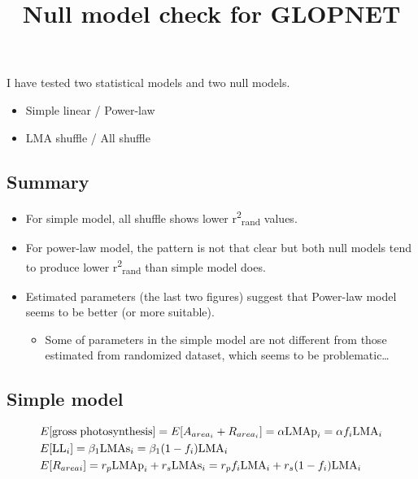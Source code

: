 \documentclass[12pt,]{article}
\title{Null model check for GLOPNET}
\author{}
\date{}
\providecommand{\tightlist}{%
  \setlength{\itemsep}{0pt}\setlength{\parskip}{0pt}}
\theoremstyle{definition}
\theoremstyle{definition}
\theoremstyle{remark}
\begin{document}
\maketitle

I have tested two statistical models and two null models.

\begin{itemize}
\tightlist
\item
  Simple linear / Power-law
\item
  LMA shuffle / All shuffle
\end{itemize}

\subsection{Summary}\label{summary}

\begin{itemize}
\tightlist
\item
  For simple model, all shuffle shows lower
  r\textsuperscript{2}\textsubscript{rand} values.
\item
  For power-law model, the pattern is not that clear but both null
  models tend to produce lower r\textsuperscript{2}\textsubscript{rand}
  than simple model does.
\item
  Estimated parameters (the last two figures) suggest that Power-law
  model seems to be better (or more suitable).

  \begin{itemize}
  \tightlist
  \item
    Some of parameters in the simple model are not different from those
    estimated from randomized dataset, which seems to be
    problematic\ldots{}
  \end{itemize}
\end{itemize}

\subsection{Simple model}\label{simple-model}

\begin{align}
  &E[{\rm gross \; photosynthesis}]
  = E[A_{area_i} + R_{area_i}]
  = \alpha{\rm LMAp}_{i}
  = \alpha f_{i} {\rm LMA}_{i} \label{eq:E-AR}\\
  &E[{\rm LL}_{i}] = \beta_{1} {\rm LMAs}_{i}
  = \beta_{1} (1 - f_{i}) {\rm LMA}_{i} \label{eq:E-LL}\\
  &E[R_{areai}] = r_{p}{\rm LMAp}_{i} + r_{s} {\rm LMAs}_{i}
  = r_{p} f_{i} {\rm LMA}_{i} + r_{s} (1 - f_{i}) {\rm LMA}_{i}
  \label{eq:E-R}
\end{align}
\end{document}
